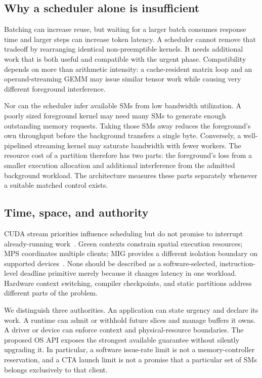 \subsection{Why a scheduler alone is insufficient}
Batching can increase reuse, but waiting for a larger batch consumes response
time and larger steps can increase token latency. A scheduler cannot remove
that tradeoff by rearranging identical non-preemptible kernels. It needs
additional work that is both useful and compatible with the urgent phase.
Compatibility depends on more than arithmetic intensity: a cache-resident
matrix loop and an operand-streaming GEMM may issue similar tensor work while
causing very different foreground interference.

Nor can the scheduler infer available SMs from low bandwidth utilization.
A poorly sized foreground kernel may need many SMs to generate enough
outstanding memory requests. Taking those SMs away reduces the foreground's
own throughput before the background transfers a single byte. Conversely,
a well-pipelined streaming kernel may saturate bandwidth with fewer workers.
The resource cost of a partition therefore has two parts: the foreground's
loss from a smaller execution allocation and additional interference from
the admitted background workload. The architecture measures these parts
separately whenever a suitable matched control exists.

\subsection{Time, space, and authority}
CUDA stream priorities influence scheduling but do not promise to interrupt
already-running work~\cite{CUDAStreams}. Green contexts constrain spatial
execution resources; MPS coordinates multiple clients; MIG provides a
different isolation boundary on supported devices~\cite{CUDAGreen,NVIDIAMPS}.
None should be described as a software-selected, instruction-level deadline
primitive merely because it changes latency in one workload. Hardware
context switching, compiler checkpoints, and static partitions address
different parts of the problem.

We distinguish three authorities. An application can state urgency and
declare its work. A runtime can admit or withhold future slices and manage
buffers it owns. A driver or device can enforce context and physical-resource
boundaries. The proposed OS API exposes the strongest available guarantee
without silently upgrading it. In particular, a software issue-rate limit is
not a memory-controller reservation, and a CTA launch limit is not a promise
that a particular set of SMs belongs exclusively to that client.

